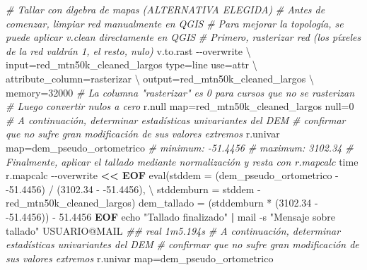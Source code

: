 \documentclass[spanish]{article}
\newenvironment{Shaded}{\begin{snugshade}}{\end{snugshade}}
\newcommand{\AttributeTok}[1]{\textcolor[rgb]{0.77,0.63,0.00}{#1}}
\newcommand{\BuiltInTok}[1]{#1}
\newcommand{\CommentTok}[1]{\textcolor[rgb]{0.56,0.35,0.01}{\textit{#1}}}
\newcommand{\DataTypeTok}[1]{\textcolor[rgb]{0.13,0.29,0.53}{#1}}
\newcommand{\ExtensionTok}[1]{#1}
\newcommand{\KeywordTok}[1]{\textcolor[rgb]{0.13,0.29,0.53}{\textbf{#1}}}
\newcommand{\NormalTok}[1]{#1}
\newcommand{\OperatorTok}[1]{\textcolor[rgb]{0.81,0.36,0.00}{\textbf{#1}}}
\newcommand{\StringTok}[1]{\textcolor[rgb]{0.31,0.60,0.02}{#1}}
\begin{document}
\begin{Shaded}
\begin{Highlighting}[]
\CommentTok{\# Tallar con álgebra de mapas (ALTERNATIVA ELEGIDA)}
\CommentTok{\# Antes de comenzar, limpiar red manualmente en QGIS}
\CommentTok{\# Para mejorar la topología, se puede aplicar v.clean directamente en QGIS}
\CommentTok{\# Primero, rasterizar red (los píxeles de la red valdrán 1, el resto, nulo)}
\ExtensionTok{v.to.rast} \AttributeTok{{-}{-}overwrite} \DataTypeTok{\textbackslash{}}
\NormalTok{  input=red\_mtn50k\_cleaned\_largos type=line use=attr }\DataTypeTok{\textbackslash{}}
\NormalTok{  attribute\_column=rasterizar }\DataTypeTok{\textbackslash{}}
\NormalTok{  output=red\_mtn50k\_cleaned\_largos }\DataTypeTok{\textbackslash{}}
\NormalTok{  memory=32000}
\CommentTok{\# La columna "rasterizar" es 0 para cursos que no se rasterizan}
\CommentTok{\# Luego convertir nulos a cero}
\ExtensionTok{r.null}\NormalTok{ map=red\_mtn50k\_cleaned\_largos null=0}
\CommentTok{\# A continuación, determinar estadísticas univariantes del DEM}
\CommentTok{\# confirmar que no sufre gran modificación de sus valores extremos}
\ExtensionTok{r.univar}\NormalTok{ map=dem\_pseudo\_ortometrico}
\CommentTok{\# minimum: {-}51.4456}
\CommentTok{\# maximum: 3102.34}
\CommentTok{\# Finalmente, aplicar el tallado mediante normalización y resta con r.mapcalc}
\BuiltInTok{time}\NormalTok{ r.mapcalc }\AttributeTok{{-}{-}overwrite} \OperatorTok{\textless{}\textless{} EOF}
\StringTok{eval(stddem = (dem\_pseudo\_ortometrico {-} {-}51.4456) / (3102.34 {-} {-}51.4456), }\DataTypeTok{\textbackslash{}}
\StringTok{     stddemburn = stddem {-} red\_mtn50k\_cleaned\_largos)}
\StringTok{dem\_tallado = (stddemburn * (3102.34 {-} {-}51.4456)) {-} 51.4456}
\OperatorTok{EOF}
\BuiltInTok{echo} \StringTok{"Tallado finalizado"} \KeywordTok{|} \ExtensionTok{mail} \AttributeTok{{-}s} \StringTok{"Mensaje sobre tallado"}\NormalTok{ USUARIO@MAIL}
\CommentTok{\#\# real 1m5.194s}
\CommentTok{\# A continuación, determinar estadísticas univariantes del DEM}
\CommentTok{\# confirmar que no sufre gran modificación de sus valores extremos}
\ExtensionTok{r.univar}\NormalTok{ map=dem\_pseudo\_ortometrico}
\end{Highlighting}
\end{Shaded}
\end{document}
